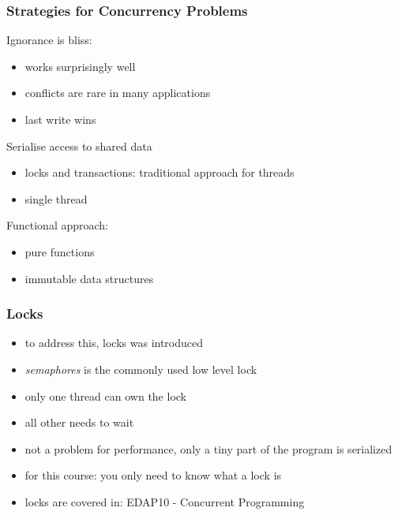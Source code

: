 \begin{frame}[fragile] \frametitle{Strategies for Concurrency Problems}
Ignorance is bliss:
\begin{itemize}
  \item works surprisingly well
  \item conflicts are rare in many applications
  \item last write wins
\end{itemize}
\vspace{3mm}
Serialise access to shared data
\begin{itemize}
  \item locks and transactions: traditional approach for threads
  \item single thread
\end{itemize}
\vspace{3mm}
Functional approach:
\begin{itemize}
  \item pure functions
  \item immutable data structures
\end{itemize}
\end{frame}

\begin{frame}[fragile] \frametitle{Locks}
\begin{itemize}
  \item to address this, locks was introduced
  \item \emph{semaphores} is the commonly used low level lock
  \item only one thread can own the lock
  \item all other needs to wait
  \item not a problem for performance, only a tiny part of the program is serialized
  \item for this course: you only need to know what a lock is
  \item locks are covered in: EDAP10 - Concurrent Programming
\end{itemize}
\end{frame}

